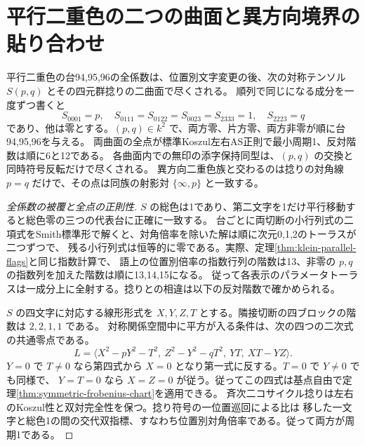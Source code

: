 \section{平行二重色の二つの曲面と異方向境界の貼り合わせ}
\label{sec:parallel-symmetric-surface}
\begin{theorem}\label{thm:parallel-symmetric-surface}
平行二重色の台94,95,96の全係数は、位置別文字変更の後、次の対称テンソル $S(p,q)$ とその四元群捻りの二曲面で尽くされる。
順列で同じになる成分を一度ずつ書くと
\[
 S_{0001}=p,\quad S_{0111}=S_{0122}=S_{0023}=S_{2333}=1,\quad S_{2223}=q
\]
であり、他は零とする。$(p,q)\in k^2$ で、両方零、片方零、両方非零が順に台94,95,96を与える。
両曲面の全点が標準Koszul左右AS正則で最小周期1、反対階数は順に6と12である。
各曲面内での無印の添字保持同型は、$(p,q)$ の交換と同時符号反転だけで尽くされる。
異方向二重色族と交わるのは捻りの対角線 $p=q$ だけで、その点は同族の射影対 $\{\infty,p\}$ と一致する。
\end{theorem}

\begin{proof}[全係数の被覆と全点の正則性]
$S$ の総色は1であり、第二文字を1だけ平行移動すると総色零の三つの代表台に正確に一致する。
台ごとに両切断の小行列式の二項式をSmith標準形で解くと、対角倍率を除いた解は順に次元0,1,2のトーラスが二つずつで、
残る小行列式は恒等的に零である。実際、定理\ref{thm:klein-parallel-flags}と同じ指数計算で、
語上の位置別倍率の指数行列の階数は13、非零の $p,q$ の指数列を加えた階数は順に13,14,15になる。
従って各表示のパラメータトーラスは一成分上に全射する。捻りとの相違は以下の反対階数で確かめられる。

$S$ の四文字に対応する線形形式を $X,Y,Z,T$ とする。隣接切断の四ブロックの階数は $2,2,1,1$ である。
対称関係空間中に平方が入る条件は、次の四つの二次式の共通零点である。
\[
 L=\langle X^2-pY^2-T^2,\ Z^2-Y^2-qT^2,\ YT,\ XT-YZ\rangle .
\]
$Y=0$ で $T\ne0$ なら第四式から $X=0$ となり第一式に反する。$T=0$ で $Y\ne0$ でも同様で、
$Y=T=0$ なら $X=Z=0$ が従う。従ってこの四式は基点自由で定理\ref{thm:symmetric-frobenius-chart}を適用できる。
斉次二コサイクル捻りは左右のKoszul性と双対完全性を保つ。捻り符号の一位置巡回による比は
移した一文字と総色1の間の交代双指標、すなわち位置別対角倍率である。従って両方が周期1である。
\end{proof}

